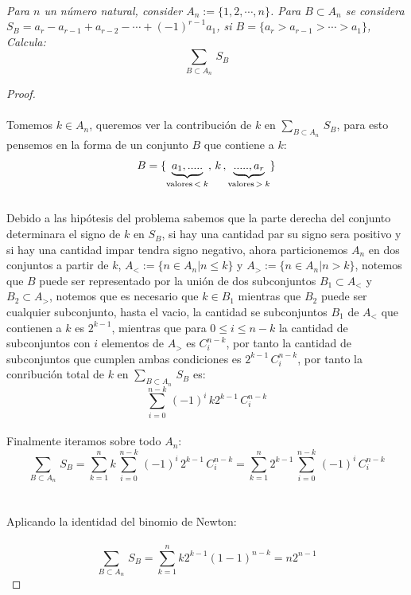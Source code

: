 \documentclass[11pt,letterpaper]{article}
\begin{document}
\,\\
\begin{tcolorbox}[
	title = \textcolor{black}{\textcolor{white}{Problema 1}},]
\textit{ Para $n$ un n\'umero natural, consider $A_n:=\{1,2,\cdots,n\}$. Para $B\subset A_n$ se considera \\
$S_B=a_r-a_{r-1}+a_{r-2}-\cdots+(-1)^{r-1}a_1$, si $B=\{a_r>a_{r-1}>\cdots>a_1\}$, Calcula:
\begin{equation*}
    \sum_{B\subset A_n}\,S_B
\end{equation*}}
\end{tcolorbox}
\begin{proof}\,\\
    \,\\
Tomemos $k\in A_n$, queremos ver la contribuci\'on de $k$ en $\sum_{B\subset A_n}\,S_B$, para esto pensemos en la forma 
de un conjunto $B$ que contiene a $k$:\,\\
\begin{equation*}
    B=\{\underbrace{a_1,.....}_\text{valores\,$<k$},\,k\,,\underbrace{.....,a_r}_\text{valores\,$>k$}\}
\end{equation*}\,\\
Debido a las hip\'otesis del problema sabemos que la parte derecha del conjunto determinara el signo de $k$ en $S_B$, si hay una cantidad par su signo sera positivo y si hay una cantidad impar tendra signo negativo, ahora particionemos $A_n$ en dos conjuntos a partir de $k$,
$A_<:=\{n\in A_n|n\leq k\}$ y $A_>:=\{n\in A_n|n>k\}$, notemos que $B$ puede ser representado por la uni\'on de dos subconjuntos $B_1\subset A_<$ y $B_2\subset A_>$, notemos que es necesario que $k\in B_1$ mientras que $B_2$ puede ser cualquier subconjunto, hasta el vacio, la cantidad se subconjuntos $B_1$ de $A_<$ que contienen a $k$ es $2^{k-1}$, mientras que para 
$0\leq i\leq n-k$ la cantidad de subconjuntos con $i$ elementos de $A_>$ es $C^{n-k}_i$, por tanto la cantidad de subconjuntos que cumplen ambas condiciones es $2^{k-1}\,C^{n-k}_{i}$, por tanto la conribuci\'on total de $k$ en $\sum_{B\subset A_n}\,S_B$ es:
\begin{equation*}
    \sum_{i=0}^{n-k}\,(-1)^{i}\,k2^{k-1}\,C^{n-k}_{i}
\end{equation*}\,\\
Finalmente iteramos sobre todo $A_n$:\,\\
\begin{equation*}
    \sum_{B\subset A_n}\,S_B=\sum_{k=1}^n k\,\sum_{i=0}^{n-k}\,(-1)^{i}\,2^{k-1}\,C^{n-k}_{i}=\sum_{k=1}^{n}2^{k-1}\, \sum_{i=0}^{n-k}\,(-1)^{i}\,C^{n-k}_{i}
\end{equation*}\,\\
\,\\
Aplicando la identidad del binomio de Newton:\,\\
\,\\
\begin{equation*}
    \sum_{B\subset A_n}\,S_B=\sum_{k=1}^{n}k2^{k-1}(1-1)^{n-k}=n2^{n-1}
\end{equation*}
\end{proof}
\end{document}
